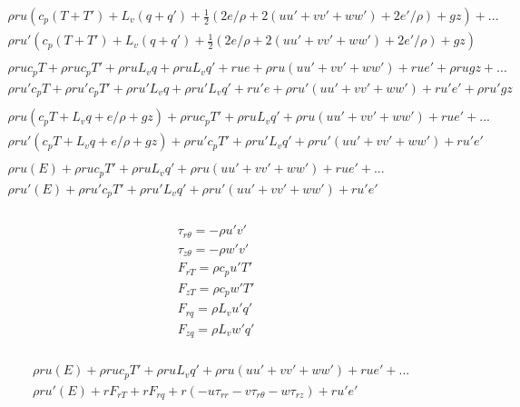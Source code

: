 \documentclass[10pt,a4paper]{article}
\newcommand{\half}{\frac{1}{2}}
\begin{document}
\begin{align}
\begin{split}
&\rho r u(c_p(T+T')+L_v(q+q')+\half(2e/\rho+2(uu'+vv'+ww')+2e'/\rho)+gz)+...\\
&\rho r u'(c_p(T+T')+L_v(q+q')+\half(2e/\rho+2(uu'+vv'+ww')+2e'/\rho)+gz)
\end{split}\\
\begin{split}
&\rho r uc_pT+\rho r uc_pT'+\rho r uL_vq+\rho r uL_vq'+ r u e+\rho r u(uu'+vv'+ww')+r u e'+\rho r ugz+...\\
&\rho r u'c_pT+\rho r u'c_pT'+\rho r u'L_vq+\rho r u'L_vq'+r u'e+\rho r u'(uu'+vv'+ww')+ r u' e'+\rho r u' gz
\end{split}\\
\begin{split}
&\rho r u(c_pT+L_vq+e/\rho+gz)+\rho r uc_pT'+\rho r uL_vq'+\rho r u(uu'+vv'+ww')+r u e'+...\\
&\rho r u'(c_pT+L_vq+e/\rho+gz)+\rho r u'c_pT'+\rho r u'L_vq'+\rho r u'(uu'+vv'+ww')+r u'e'
\end{split}\\
\begin{split}
&\rho r u(E)+\rho r uc_pT'+\rho r uL_vq'+\rho r u(uu'+vv'+ww')+r u e'+...\\
&\rho r u'(E)+\rho r u'c_pT'+\rho r u'L_vq'+\rho r u'(uu'+vv'+ww')+ r u' e'
\end{split}\\
\end{align}

\begin{align}
\tau_{r \theta} = -\rho u'v'\\
\tau_{z \theta}=  -\rho w'v'\\
F_{rT} = \rho c_p u'T'\\
F_{zT} = \rho c_p w'T'\\
F_{rq} = \rho L_v u'q'\\
F_{zq} = \rho L_v w'q'\\
\end{align}

\begin{align}
\begin{split}
&\rho r u(E)+\rho r uc_pT'+\rho r uL_vq'+\rho r u(uu'+vv'+ww')+ r u e'+...\\
&\rho r u'(E)+rF_{rT}+ rF_{rq}+ r(-u\tau_{rr} -v\tau_{r \theta}-w\tau_{r z})+ r u'e'
\end{split}\\
\end{align}
\end{document}
